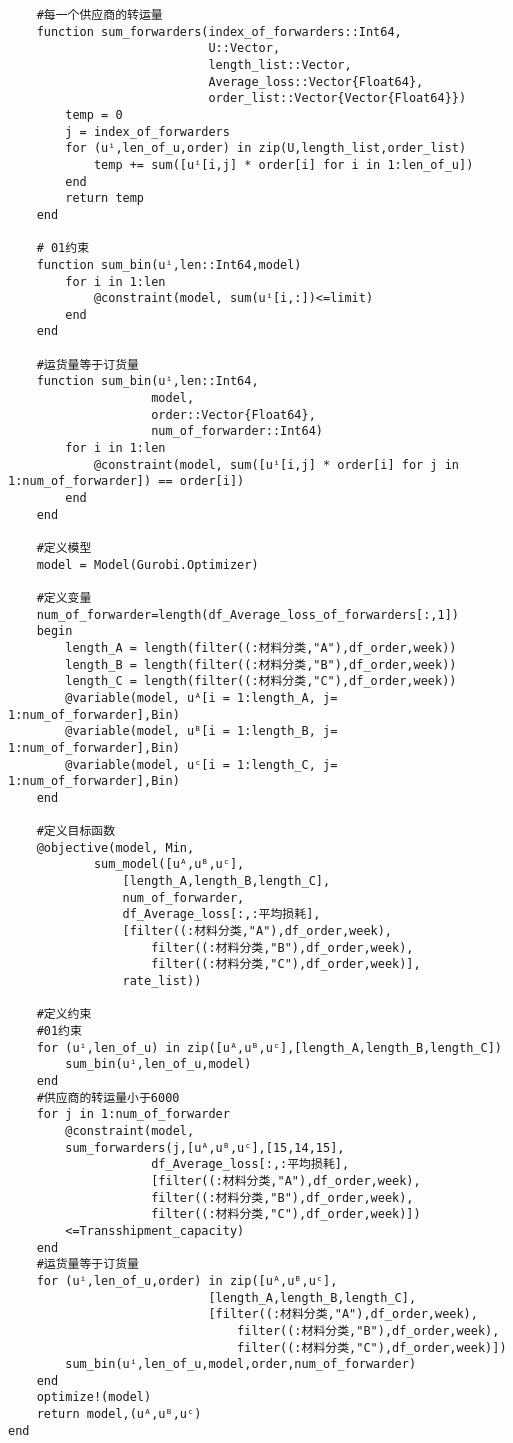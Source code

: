 \begin{appendices}
\begin{lstlisting}
	#每一个供应商的转运量
	function sum_forwarders(index_of_forwarders::Int64,
							U::Vector,
							length_list::Vector,
							Average_loss::Vector{Float64},
							order_list::Vector{Vector{Float64}})
		temp = 0
		j = index_of_forwarders
		for (uⁱ,len_of_u,order) in zip(U,length_list,order_list)
			temp += sum([uⁱ[i,j] * order[i] for i in 1:len_of_u])
		end
		return temp
	end

	# 01约束
	function sum_bin(uⁱ,len::Int64,model)
		for i in 1:len
			@constraint(model, sum(uⁱ[i,:])<=limit)
		end
	end

	#运货量等于订货量
	function sum_bin(uⁱ,len::Int64,
					model,
					order::Vector{Float64},
					num_of_forwarder::Int64)
		for i in 1:len
			@constraint(model, sum([uⁱ[i,j] * order[i] for j in 1:num_of_forwarder]) == order[i])
		end
	end

	#定义模型
	model = Model(Gurobi.Optimizer)

	#定义变量
	num_of_forwarder=length(df_Average_loss_of_forwarders[:,1])
	begin
		length_A = length(filter((:材料分类,"A"),df_order,week))
		length_B = length(filter((:材料分类,"B"),df_order,week))
		length_C = length(filter((:材料分类,"C"),df_order,week))
		@variable(model, uᴬ[i = 1:length_A, j= 1:num_of_forwarder],Bin)
		@variable(model, uᴮ[i = 1:length_B, j= 1:num_of_forwarder],Bin)
		@variable(model, uᶜ[i = 1:length_C, j= 1:num_of_forwarder],Bin)
	end

	#定义目标函数
	@objective(model, Min,
			sum_model([uᴬ,uᴮ,uᶜ],
				[length_A,length_B,length_C],
				num_of_forwarder,
				df_Average_loss[:,:平均损耗],
				[filter((:材料分类,"A"),df_order,week),
					filter((:材料分类,"B"),df_order,week),
					filter((:材料分类,"C"),df_order,week)],
				rate_list))

	#定义约束
	#01约束
	for (uⁱ,len_of_u) in zip([uᴬ,uᴮ,uᶜ],[length_A,length_B,length_C])
		sum_bin(uⁱ,len_of_u,model)
	end
	#供应商的转运量小于6000
	for j in 1:num_of_forwarder
		@constraint(model,
		sum_forwarders(j,[uᴬ,uᴮ,uᶜ],[15,14,15],
					df_Average_loss[:,:平均损耗],
					[filter((:材料分类,"A"),df_order,week),
					filter((:材料分类,"B"),df_order,week),
					filter((:材料分类,"C"),df_order,week)])
		<=Transshipment_capacity)
	end
	#运货量等于订货量
	for (uⁱ,len_of_u,order) in zip([uᴬ,uᴮ,uᶜ],
							[length_A,length_B,length_C],
							[filter((:材料分类,"A"),df_order,week),
								filter((:材料分类,"B"),df_order,week),
								filter((:材料分类,"C"),df_order,week)])
		sum_bin(uⁱ,len_of_u,model,order,num_of_forwarder)
	end
	optimize!(model)
	return model,(uᴬ,uᴮ,uᶜ)
end


\end{lstlisting}
\end{appendices}
